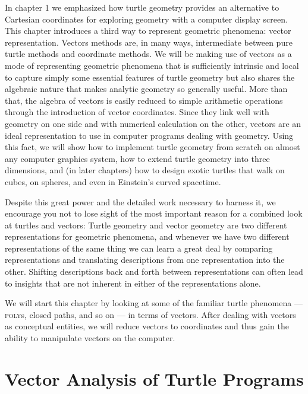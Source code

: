 \documentclass{book}
\begin{document}
In chapter 1 we emphasized how turtle geometry provides an alternative to Cartesian coordinates for exploring geometry with a computer display screen. This chapter introduces a third way to represent
geometric phenomena: vector representation. Vectors methods are, in
many ways, intermediate between pure turtle methods and coordinate
methods. We will be making use of vectors as a mode of representing
geometric phenomena that is sufficiently intrinsic and local to capture
simply some essential features of turtle geometry but also shares the algebraic nature that makes analytic geometry so generally useful. More
than that, the algebra of vectors is easily reduced to simple arithmetic
operations through the introduction of vector coordinates. Since they
link well with geometry on one side and with numerical calculation on the
other, vectors are an ideal representation to use in computer programs
dealing with geometry. Using this fact, we will show how to implement
turtle geometry from scratch on almost any computer graphics system,
how to extend turtle geometry into three dimensions, and (in later chapters) how to design exotic turtles that walk on cubes, on spheres, and
even in Einstein's curved spacetime.

Despite this great power and the detailed work necessary to harness
it, we encourage you not to lose sight of the most important reason
for a combined look at turtles and vectors: Turtle geometry and vector
geometry are two different representations for geometric phenomena,
and whenever we have two different representations of the same thing
we can learn a great deal by comparing representations and translating
descriptions from one representation into the other. Shifting descriptions
back and forth between representations can often lead to insights that
are not inherent in either of the representations alone.

We will start this chapter by looking at some of the familiar turtle
phenomena --- \textsc{poly}s, closed paths, and so on --- in terms of vectors. After
dealing with vectors as conceptual entities, we will reduce vectors to
coordinates and thus gain the ability to manipulate vectors on the computer.

\section{Vector Analysis of Turtle Programs}
\end{document}
